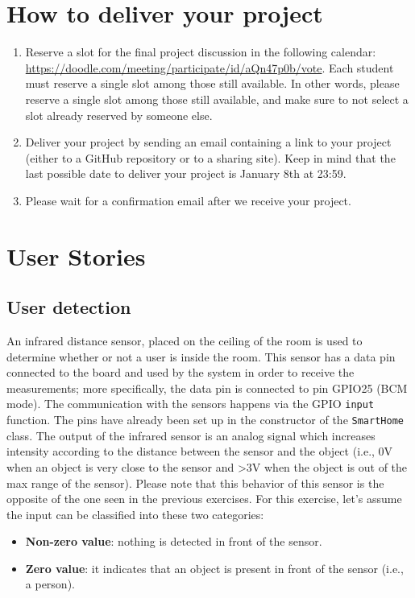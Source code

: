 \section{How to deliver your project}
\begin{enumerate}
    \item Reserve a slot for the final project discussion in the following calendar: \url{https://doodle.com/meeting/participate/id/aQn47p0b/vote}.
    Each student must reserve a single slot among those still available. In other words, please reserve a single slot among those still available, and make sure to not select a slot already reserved by someone else.
    \item Deliver your project by sending an email containing a link to your project (either to a GitHub repository or to a sharing site).
    Keep in mind that the last possible date to deliver your project is January 8th at 23:59. 
    \item Please wait for a confirmation email after we receive your project.
\end{enumerate}

\section{User Stories}
\subsection{User detection}
An infrared distance sensor, placed on the ceiling of the room is used to determine whether or not a user is inside the room. 
This sensor has a data pin connected to the board and used by the system in order to receive the measurements; more specifically, the data pin is connected to pin GPIO25 (BCM mode).
The communication with the sensors happens via the GPIO \texttt{input} function. The pins have already been set up in the constructor of the \texttt{SmartHome} class. 
The output of the infrared sensor is an analog signal which increases intensity according to the distance between the sensor and the object (i.e., 0V when an object is very close to the sensor and >3V when the object is out of the max range of the sensor). 
Please note that this behavior of this sensor is the opposite of the one seen in the previous exercises.
For this exercise, let's assume the input can be classified into these two categories:
\begin{itemize}
    \item \textbf{Non-zero value}: nothing is detected in front of the sensor.
    \item \textbf{Zero value}: it indicates that an object is present in front of the sensor (i.e., a person).
\end{itemize}

